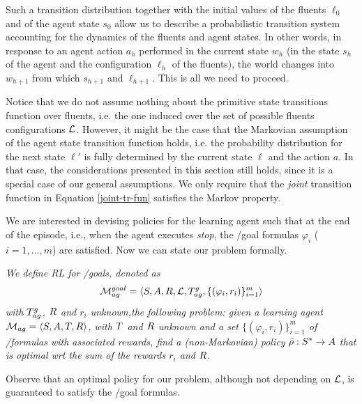 Such a transition distribution together with the initial values of the
fluents $\ell_0$ and of the agent state $s_0$ allow us to describe a
probabilistic transition system accounting for the dynamics of the
fluents and agent states. 
In other words, in response to an agent action $a_h$ performed in the current state
$w_h$ (in the state $s_h$ of the agent and the
configuration $\ell_h$ of the fluents), the world changes into $w_{h+1}$ from which $s_{h+1} $ and $\ell_{h+1}$. This is all we need to proceed.



Notice that we do not assume nothing about the primitive state transitions function over fluents, i.e. the one induced over the set of possible fluents configurations $\mathcal{L}$. However, it might be the case that the Markovian assumption of the agent state transition function holds, i.e. the probability distribution for the next state $\ell'$ is fully determined by the current state $\ell$ and the action $a$. In that case, the considerations presented in this section still holds, since it is a special case of our general assumptions. We only require that the \emph{joint} transition function in Equation \ref{joint-tr-fun} satisfies the Markov property.


\medskip
We are interested in devising policies for the learning agent such that
at the end of the episode, i.e., when the agent executes \emph{stop},
the \LTLf /\LDLf goal formulas $\varphi_i$ ($i=1,\ldots,m$)  are satisfied.
Now we can state our problem formally.

\noindent
\begin{definition}\label{def:rl-for-llf-goals}
	 \textit{
	We define \emph{RL for \LTLf /\LDLf goals}, denoted as
	\[\mathcal{M}_{ag}^{goal}= \langle S, A, R, \mathcal{L}, T_{ag}^{g}, \{(\varphi_i,r_i)\}_{i=1}^{m} \rangle\] with $T_{ag}^{g}$, $R$ and
	$r_i$ unknown,the following problem: given a learning agent
	$\mathcal{M}_{ag} = \langle S, A, T, R \rangle$, with $T$ and $R$ unknown and
	a set $\{(\varphi_i,r_i)\}_{i=1}^{m}$ of \LTLf /\LDLf formulas with
	associated rewards, find a (non-Markovian) policy
	$\bar{\rho}:S^*\rightarrow A$ that is optimal wrt the sum of the rewards
	$r_i$ and $R$.}
\end{definition}
Observe that an optimal policy for our problem, although not depending on $\mathcal{L}$, is guaranteed to satisfy the \LTLf /\LDLf goal formulas.

